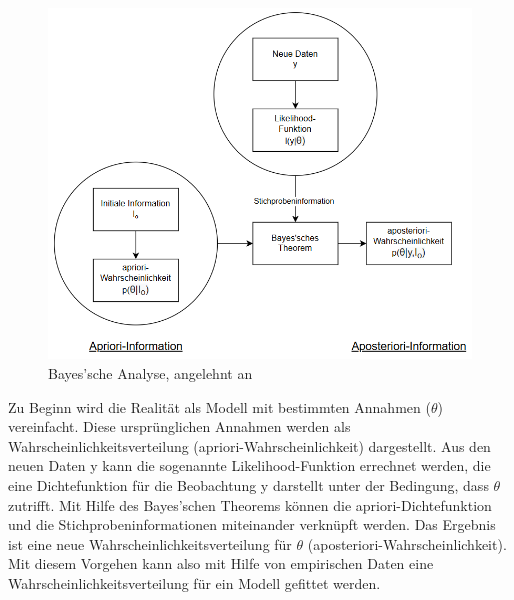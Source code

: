 \begin{figure}[H]
	\centering
	\includegraphics[scale = 0.8]{Bilder/bayesianInterence.png}
	\caption{Bayes'sche Analyse, angelehnt an \cite{nenning_bayessche_1980}}
	\label{fig:bayesianInference}
\end{figure}

Zu Beginn wird die Realität als Modell mit bestimmten Annahmen ($\theta$) vereinfacht.
Diese ursprünglichen Annahmen werden als Wahrscheinlichkeitsverteilung (apriori-Wahr\-schein\-lich\-keit) dargestellt. 
Aus den neuen Daten y kann die sogenannte
Likelihood-Funktion errechnet werden, die eine Dichtefunktion für die Beobachtung y darstellt unter der Bedingung, dass $\theta$ zutrifft.
Mit Hilfe des Bayes'schen Theorems können die apriori-Dichtefunktion und die Stichprobeninformationen miteinander verknüpft werden.
Das Ergebnis ist eine neue Wahrscheinlichkeitsverteilung für $\theta$ (aposteriori-Wahrscheinlichkeit). \cite{nenning_bayessche_1980}
Mit diesem Vorgehen kann also mit Hilfe von empirischen Daten eine Wahrscheinlichkeitsverteilung für ein Modell gefittet werden.\\

